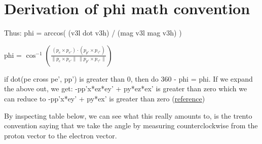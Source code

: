 \chapter{Derivation of phi math convention}


Thus:
phi = arccos( (v3l dot v3h) / (mag v3l mag v3h) ) 

phi =    \footnotesize{$\cos^{-1} \left( \frac{ \left(p_{e} \times p_{e'} \right) \cdot \left( p_{p'} \times p_{\gamma^*} \right) }{ \lVert p_{e} \times p_{e'} \rVert \: \lVert p_{p'} \times p_{\gamma^*} \rVert} \right)$}

if dot(pe cross pe', pp') is greater than 0, then do 360 - phi = phi.
If we expand the above out, we get:
-pp'x*ez*ey' + py*ez*ex' is greater than zero
which we can reduce to 
-pp'x*ey' + py*ex' is greater than zero (\href{https://www.overleaf.com/project/6140d04f4cd346c4b187c1d8#}{reference})

By inspecting table below, we can see what this really amounts to, is the trento convention saying that we take the angle by measuring counterclockwise from the proton vector to the electron vector.


